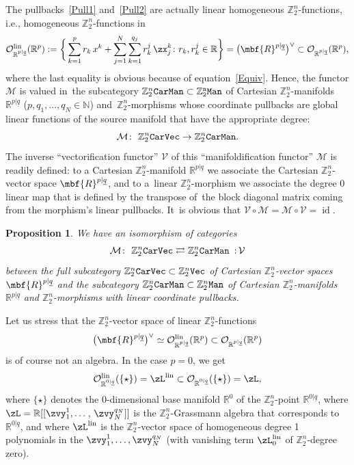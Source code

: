 \documentclass[pdftex]{sigma}%
\newcommand{\op}[1]{\operatorname{#1}}
\newcommand{\R}{{\mathbb R}}
\newcommand{\Z}{{\mathbb Z}}
\def\ul{\underline}
\def\cM{\cal M}
\def\cO{\mathcal{O}}
\def\cM{\mathcal{M}}
\def\ul{\underline}
\newcommand{\0}{\otimes}
\newcommand{\z}{\Z_2^n}
\numberwithin{equation}{section}
\newtheorem{Proposition}[Theorem]{Proposition}
 { \theoremstyle{definition}
\newtheorem{Definition}[Theorem]{Definition}
\newtheorem{Example}[Theorem]{Example}
\newtheorem{Remark}[Theorem]{Remark} }
\begin{document}
\newcommand{\cV}{\mathcal{V}}

The pullbacks~\eqref{Pull1} and~\eqref{Pull2} are actually linear homogeneous $\z$-functions, i.e., homogeneous $\z$-functions in
\begin{gather}\label{LinFun}
\cO^{\op{lin}}_{\R^{p|\ul q}}(\R^p):=\bigg\{\sum_{k=1}^{p} r_k\,x^k+\sum_{j=1}^N\sum_{k=1}^{q_j} r^j_k\,\zx^k_j\colon r_k, r^j_k\in\R\bigg\}=\big(\mbf{R}^{p|\ul q}\big)^\vee\subset\cO_{\R^{p|\ul q}}(\R^{p}),
\end{gather}
where the last equality is obvious because of equation~\eqref{Equiv}. Hence, the functor $\cM$ is valued in~the subcategory $\Z_2^n\tt{CarMan}\subset\Z_2^n\tt Man$ of Cartesian $\Z_2^n$-manifolds $\R^{p|\ul q}$ ($p,q_1,\dots,q_N\in\mathbb N$) and~$\Z_2^n$-morphisms whose coordinate pullbacks are global linear functions of the source manifold that have the appropriate degree:
\[
\mathcal{M}\colon\ \Z_2^n{\tt CarVec}\to \Z_2^n\tt CarMan.
\]
The inverse ``vectorification functor'' $\cV$ of this ``manifoldification functor'' $\cM$ is readily defined: to a Cartesian $\Z_2^n$-manifold $\R^{p|\ul q}$ we associate the Cartesian $\Z_2^n$-vector space $\mbf{R}^{p|\ul q}$, and to a~linear $\Z_2^n$-morphism we associate the degree 0 linear map that is defined by the transpose of~the block diagonal matrix coming from the morphism's linear pullbacks. It~is obvious that $\cV\circ\cM=\cM\circ\cV=\op{id}$.

\begin{Proposition}\label{IsoCatCar}
We have an isomorphism of categories
\begin{gather}\label{FunEquivCar}
\mathcal{M}\colon\ \Z_2^n{\tt CarVec}\rightleftarrows\Z_2^n\tt CarMan\ \, {:}\,\cV
\end{gather}
between the full subcategory $\Z_2^n{\tt CarVec}\subset\Z_2^n\tt{Vec}$ of Cartesian $\Z_2^n$-vector spaces $\mbf{R}^{p|\ul q}$ and the subcategory $\Z_2^n{\tt Car}{\tt Man}\subset\Z_2^n{\tt Man}$ of Cartesian $\Z_2^n$-manifolds $\R^{p|\ul q}$ and $\Z_2^n$-morphisms with linear coordinate pullbacks.
\end{Proposition}

\begin{Remark} Let us stress that the $\Z_2^n$-vector space of linear $\z$-functions
\[
\big(\mbf{R}^{p|\ul q}\big)^\vee\simeq\cO_{\R^{p|\ul q}}^{\op{lin}}(\R^{p})\subset \cO_{\R^{p|\ul q}}(\R^p)
\]
is of course not an algebra. In the case $p=0$, we get
\[
\cO^{\op{lin}}_{\R^{0|\ul q}}(\{\star\})=\zL^{\op{lin}}\subset\cO_{\R^{0|\ul q}}(\{\star\})=\zL,
\]
where $\{\star\}$ denotes the 0-dimensional base manifold $\R^0$ of the $\z$-point $\R^{0|\ul q}$, where $\zL=\R[[\zvy^1_1,\dots$, $\zvy^{q_N}_N]]$ is the $\z$-Grassmann algebra that corresponds to $\R^{0|\ul q}$, and where $\zL^{\op{lin}}$ is the $\z$-vector space of homogeneous degree 1 polynomials in the $\zvy_1^1,\dots,\zvy_N^{q_N}$ (with vanishing term $\zL_0^{\op{lin}}$ of $\z$-degree zero).
\end{Remark}
\end{document}
